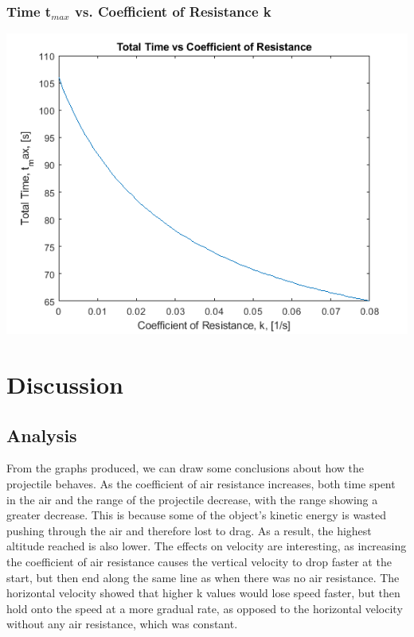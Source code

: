 \documentclass[oneside]{article}
\begin{document}
\subsubsection{Time t$_{max}$ vs. Coefficient of Resistance k}
\includegraphics [width=\linewidth*4/5]{graph_t-k.png}


\newpage
\section{Discussion}
\subsection{Analysis}
From the graphs produced, we can draw some conclusions about how the projectile behaves. As the coefficient of air resistance increases, both time spent in the air and the range of the projectile decrease, with the range showing a greater decrease. This is because some of the object's kinetic energy is wasted pushing through the air and therefore lost to drag. As a result, the highest altitude reached is also lower. The effects on velocity are interesting, as increasing the coefficient of air resistance causes the vertical velocity to drop faster at the start, but then end along the same line as when there was no air resistance. The horizontal velocity showed that higher k values would lose speed faster, but then hold onto the speed at a more gradual rate, as opposed to the horizontal velocity without any air resistance, which was constant. 
\end{document}
